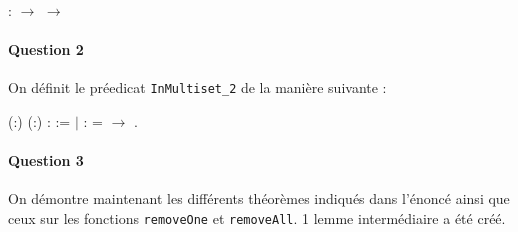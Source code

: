\documentclass{report}
\begin{document}
\noindent\begin{coqdoccode}
\coqdocemptyline
\coqdocnoindent
{} :
 \ensuremath{\rightarrow}
 \ensuremath{\rightarrow}
\end{coqdoccode}

\paragraph{Question 2}

On définit le préedicat \texttt{InMultiset\_2} de la manière suivante :\\

\begin{coqdoccode}
\coqdocnoindent
{}  (:) (:) :  := \coqdoceol
\coqdocindent{1.00em}
\ensuremath{|}  :    =  \ensuremath{\rightarrow}   .\coqdoceol
\coqdocemptyline
\end{coqdoccode}

\paragraph{Question 3}

On démontre maintenant les différents théorèmes indiqués dans l’énoncé ainsi que ceux sur les fonctions \texttt{removeOne} et \texttt{removeAll}. 1 lemme intermédiaire a été créé.
\end{document}
